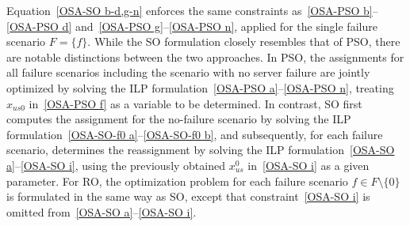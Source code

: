 \documentclass[10pt, letterpaper]{IEEEtran}
\begin{document}
\begin{CJK}{UTF8}{ipxm}
{%
Equation~\eqref{OSA-SO b-d,g-n} enforces the same constraints as~\eqref{OSA-PSO b}--\eqref{OSA-PSO d} and~\eqref{OSA-PSO g}--\eqref{OSA-PSO n}, applied for the single failure scenario $F = \{f\}$.
While the SO formulation closely resembles that of PSO, there are notable distinctions between the two approaches.
In PSO, the assignments for all failure scenarios including the scenario with no server failure are jointly optimized by solving the ILP formulation~\eqref{OSA-PSO a}--\eqref{OSA-PSO n}, treating $x_{us0}$ in~\eqref{OSA-PSO f} as a variable to be determined.
In contrast, SO first computes the assignment for the no-failure scenario by solving the ILP formulation~\eqref{OSA-SO-f0 a}--\eqref{OSA-SO-f0 b}, and subsequently, for each failure scenario, determines the reassignment by solving the ILP formulation~\eqref{OSA-SO a}--\eqref{OSA-SO i}, using the previously obtained $x^0_{us}$ in~\eqref{OSA-SO i} as a given parameter.
For RO, the optimization problem for each failure scenario $f \in F \setminus \{0\}$ is formulated in the same way as SO, except that constraint~\eqref{OSA-SO i} is omitted from~\eqref{OSA-SO a}--\eqref{OSA-SO i}.
}


\end{CJK}
\end{document}
